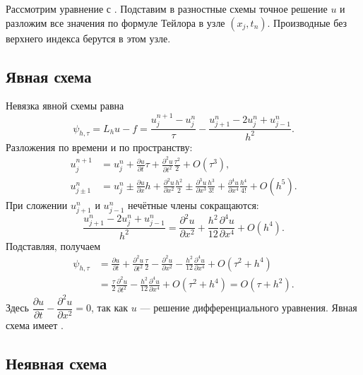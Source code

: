 \documentclass[../final.tex]{subfiles}
\begin{document}
Рассмотрим уравнение с .
Подставим в разностные схемы точное решение $u$ и разложим
все значения по формуле Тейлора в узле $(x_j,t_n)$.
Производные без верхнего индекса берутся в этом узле.

\subsection{Явная схема}

Невязка явной схемы равна
\begin{equation*}
    \psi_{h,\tau}=L_hu-f
    =\frac{u_j^{n+1}-u_j^n}{\tau}
    -\frac{u_{j+1}^n-2u_j^n+u_{j-1}^n}{h^2}.
\end{equation*}
Разложения по времени и по пространству:
\begin{align*}
    u_j^{n+1}&=u_j^n+\frac{\partial u}{\partial t}\tau
    +\frac{\partial^2u}{\partial t^2}\frac{\tau^2}{2}+O(\tau^3),\\
    u_{j\pm1}^n&=u_j^n\pm\frac{\partial u}{\partial x}h
    +\frac{\partial^2u}{\partial x^2}\frac{h^2}{2}
    \pm\frac{\partial^3u}{\partial x^3}\frac{h^3}{3!}
    +\frac{\partial^4u}{\partial x^4}\frac{h^4}{4!}+O(h^5).
\end{align*}
При сложении $u_{j+1}^n$ и $u_{j-1}^n$ нечётные члены сокращаются:
\begin{equation*}
    \frac{u_{j+1}^n-2u_j^n+u_{j-1}^n}{h^2}
    =\frac{\partial^2u}{\partial x^2}
    +\frac{h^2}{12}\frac{\partial^4u}{\partial x^4}+O(h^4).
\end{equation*}
Подставляя, получаем
\begin{align*}
    \psi_{h,\tau}
    &=\frac{\partial u}{\partial t}
    +\frac{\partial^2u}{\partial t^2}\frac{\tau}{2}
    -\frac{\partial^2u}{\partial x^2}
    -\frac{h^2}{12}\frac{\partial^4u}{\partial x^4}
    +O(\tau^2+h^4)\\
    &=\frac{\tau}{2}\frac{\partial^2u}{\partial t^2}
    -\frac{h^2}{12}\frac{\partial^4u}{\partial x^4}
    +O(\tau^2+h^4)=O(\tau+h^2).
\end{align*}
Здесь $\dfrac{\partial u}{\partial t}-\dfrac{\partial^2u}{\partial x^2}=0$,
так как $u$ --- решение дифференциального уравнения.
Явная схема имеет .

\subsection{Неявная схема}
\end{document}
